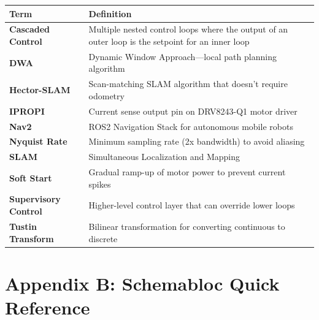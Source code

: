 \documentclass[11pt,letterpaper]{article}
\begin{document}
\begin{table}[H]
\begin{tabular}{@{}p{3.5cm}p{10.5cm}@{}}
\toprule
\textbf{Term} & \textbf{Definition} \\
\midrule
\textbf{Cascaded Control} & Multiple nested control loops where the output of an outer loop is the setpoint for an inner loop \\
\textbf{DWA} & Dynamic Window Approach---local path planning algorithm \\
\textbf{Hector-SLAM} & Scan-matching SLAM algorithm that doesn't require odometry \\
\textbf{IPROPI} & Current sense output pin on DRV8243-Q1 motor driver \\
\textbf{Nav2} & ROS2 Navigation Stack for autonomous mobile robots \\
\textbf{Nyquist Rate} & Minimum sampling rate (2x bandwidth) to avoid aliasing \\
\textbf{SLAM} & Simultaneous Localization and Mapping \\
\textbf{Soft Start} & Gradual ramp-up of motor power to prevent current spikes \\
\textbf{Supervisory Control} & Higher-level control layer that can override lower loops \\
\textbf{Tustin Transform} & Bilinear transformation for converting continuous to discrete \\
\bottomrule
\end{tabular}
\end{table}

\newpage
\section*{Appendix B: Schemabloc Quick Reference}
\end{document}
